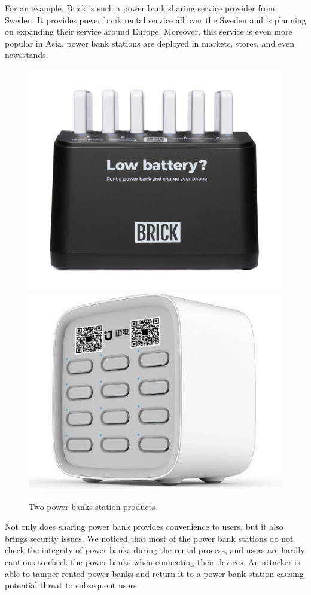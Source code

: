 For an example, Brick is such a power bank sharing service
provider from Sweden. It provides power bank rental service all over the Sweden
and is planning on expanding their service around Europe. Moreover, this
service is even more popular in Asia, power bank stations are deployed in
markets, stores, and even newsstands.

\begin{figure}[t]
	\centering
	\includegraphics[width=.4 \linewidth]{./Figs/Brick_station.png}
	\includegraphics[width=.4 \linewidth]{./Figs/jiedian.jpg}
	\caption{Two power banks station products}
	\label{fig:PBS_products}
\end{figure}



Not only does sharing power bank provides convenience to users, but it also
brings security issues.  We noticed that most of the power bank stations do not
check the integrity of power banks during the rental process, and users are
hardly cautious to check the power banks when connecting their devices.  An
attacker is able to tamper rented power banks and return it to a power bank
station causing potential threat to subsequent users.


